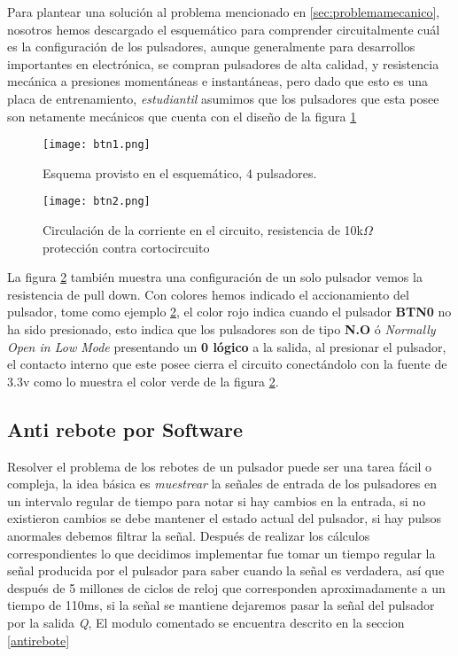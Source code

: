 \documentclass[a4paper]{article}
\begin{document}
Para plantear una solución al problema mencionado en \ref{sec:problemamecanico}, nosotros hemos descargado el esquemático para comprender circuitalmente cuál es la configuración de los pulsadores, aunque generalmente para desarrollos importantes en electrónica, se compran  pulsadores de alta calidad, y resistencia mecánica a presiones momentáneas e instantáneas, pero dado que esto es una placa de entrenamiento, \textit{estudiantil} asumimos que los pulsadores que esta posee son netamente mecánicos que cuenta con el diseño de la figura \ref{fig:btn}
\begin{figure}[H]
  \centering
     \texttt{[image: btn1.png]}
  \caption{Esquema provisto en el esquemático, 4 pulsadores.}
    \label{fig:btn}
\end{figure}

\begin{figure}[H]
  \centering
     \texttt{[image: btn2.png]}
  \caption{Circulación de la corriente en el circuito, resistencia de 10k$\Omega$ protección contra cortocircuito}
      \label{fig:btn2}
\end{figure}
La figura \ref{fig:btn2} también muestra una configuración de un solo pulsador vemos la resistencia de pull down. Con colores hemos indicado el accionamiento del pulsador, tome como ejemplo \ref{fig:btn2}, el color rojo indica cuando el pulsador \textbf{BTN0} no ha sido presionado, esto indica que los pulsadores son de tipo \textbf{N.O} ó \textit{Normally Open in Low Mode} presentando un \textbf{0 lógico} a la salida, al presionar el pulsador, el contacto interno que este posee cierra el circuito conectándolo con la fuente de 3.3v como lo muestra el color verde de la figura \ref{fig:btn2}.
\subsection{Anti rebote por Software}
Resolver el problema de los rebotes de un pulsador puede ser una tarea fácil o compleja, la idea básica es \emph{muestrear} la señales de entrada de los pulsadores en un intervalo regular de tiempo para notar si hay cambios en la entrada, si no existieron cambios se debe mantener el estado actual del pulsador, si hay pulsos anormales debemos filtrar la señal. Después de realizar los cálculos correspondientes lo que decidimos implementar fue tomar un tiempo regular la señal producida por el pulsador para saber cuando la señal es verdadera, así que después de 5 millones de ciclos de reloj que corresponden aproximadamente a un tiempo de 110ms, si la señal se mantiene dejaremos pasar la señal del pulsador por la salida \emph{Q}, El modulo comentado se encuentra descrito en la seccion \ref{antirebote}
\end{document}
